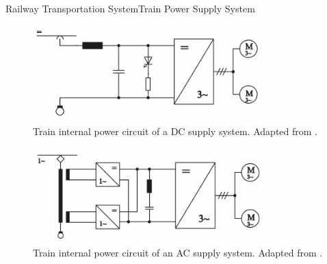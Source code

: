 \begin{frame}{Railway Transportation System}{Train Power Supply System}


	\begin{minipage}[t]{0.48\linewidth}

	
	\begin{figure}[ht!]
		\centering
			\includegraphics[width=0.8\textwidth,keepaspectratio]{figures/31.PowerS/steimel2008a}
		\caption{Train internal power circuit of a \ac{DC} supply system. Adapted from \cite{steimel2008}.}
	\end{figure}
\end{minipage}\hfill
\begin{minipage}[t]{0.48\linewidth}
	
	
	\begin{figure}[ht!]
		\centering
		\includegraphics[width=0.8\textwidth,keepaspectratio]{figures/31.PowerS/steimel2008b}
		\caption{Train internal power circuit of an \ac{AC} supply system. Adapted from \cite{steimel2008}.}
	\end{figure}
	
	
	
\end{minipage}


\end{frame}
